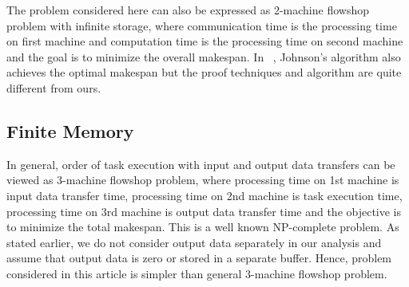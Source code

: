 \documentclass[runningheads]{llncs} %
\begin{document}


The problem considered here can also be expressed as 2-machine flowshop problem with infinite storage, where communication time is the processing time on first machine and computation time is the processing time on second machine and the goal is to minimize the overall makespan. In ~\cite{johnson}, Johnson's algorithm also achieves the optimal makespan but the proof techniques and algorithm are quite different from ours.
	\subsection{Finite Memory}
	
	In general, order of task execution with input and output data transfers can be 
	viewed as  3-machine flowshop problem, where processing time on 1st machine is 
	input data transfer time,  processing time on 2nd machine is task execution time, 
	processing time on 3rd machine is output data transfer time  and the objective is 
	to minimize the total makespan. This is a well known NP-complete problem. 
	As stated earlier, we do not consider output data separately in our analysis and assume that output data is zero or stored in a separate buffer. Hence, problem considered in this article is simpler than general 3-machine flowshop problem.
	
\end{document}
